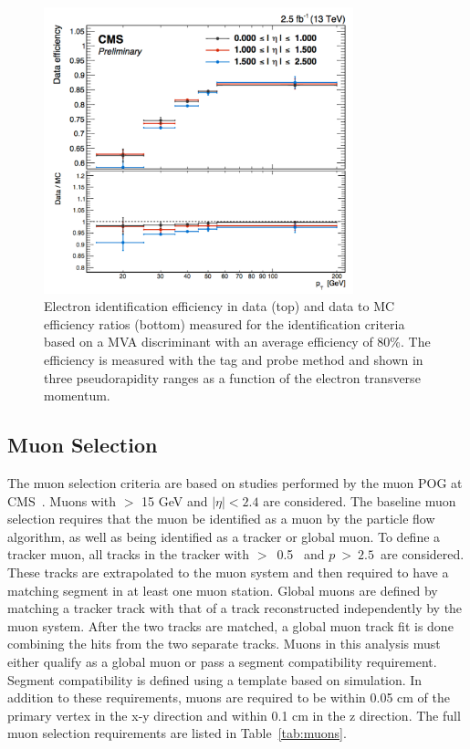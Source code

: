 \begin{figure}[!ht]
  \begin{center}
      \includegraphics[width=0.8\textwidth]{evtsel/figs/Electron_MVA_efficiency.pdf}
    \caption{
      \label{fig:electronideff}
      Electron identification efficiency in data (top) and data to MC efficiency ratios (bottom)
      measured for the identification criteria based on a MVA discriminant with an average efficiency of 80\%.
      The efficiency is measured with the tag and probe method and shown in three pseudorapidity ranges as a function of the electron transverse momentum.
    }
  \end{center}
\end{figure}
  

\subsection{Muon Selection}
\label{ssec:musel}
The muon selection criteria are based on studies performed by the muon POG at CMS~\cite{tdr1}\cite{muonReco}.
Muons with \pt $>$ 15 GeV and $|\eta|<2.4$ are considered. 
The baseline muon selection requires that the muon be identified as a muon by the particle flow algorithm,
as well as being identified as a tracker or global muon.
To define a tracker muon, all tracks in the tracker with \pt $>$~0.5 \gev\ and $p~>~2.5$~\gev are considered.
These tracks are extrapolated to the muon system and then required to have a matching segment in at least one muon station.
Global muons are defined by matching a tracker track with that of a track reconstructed independently by the muon system.
After the two tracks are matched, a global muon track fit is done combining the hits from the two separate tracks.
Muons in this analysis must either qualify as a global muon or pass a segment compatibility requirement.
Segment compatibility is defined using a template based on simulation.
In addition to these requirements, muons are required to be within 0.05 cm of the primary vertex in the x-y direction and within 0.1 cm in the z direction.
The full muon selection requirements are listed in Table~\ref{tab:muons}.

